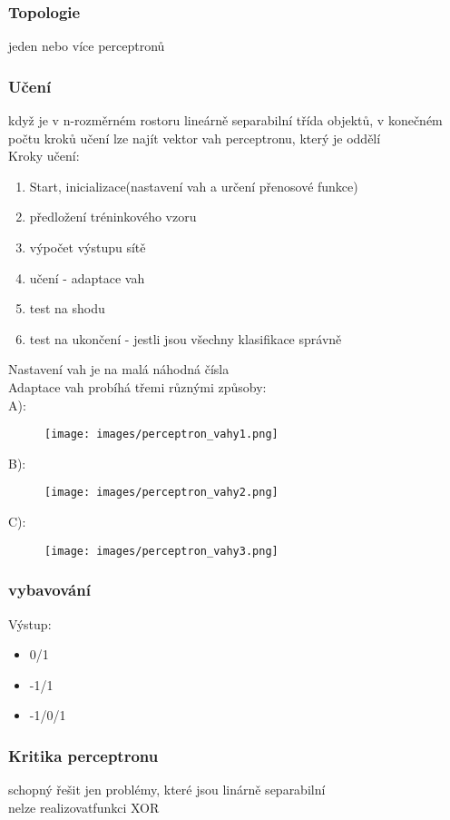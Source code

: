 \subsubsection{Topologie}
jeden nebo více perceptronů
\subsubsection{Učení}
když je v n-rozměrném rostoru lineárně separabilní třída objektů, v konečném počtu kroků učení lze najít vektor vah perceptronu, který je oddělí\\
Kroky učení:
\begin{enumerate}
    \item Start, inicializace(nastavení vah a určení přenosové funkce)
    \item předložení tréninkového vzoru
    \item výpočet výstupu sítě
    \item učení - adaptace vah
    \item test na shodu
    \item test na ukončení - jestli jsou všechny klasifikace správně
\end{enumerate}
Nastavení vah je na malá náhodná čísla\\
Adaptace vah probíhá třemi různými způsoby:\\
A):
\begin{figure}[H]
    \texttt{[image: images/perceptron\_vahy1.png]}
\end{figure}
B):
\begin{figure}[H]
    \texttt{[image: images/perceptron\_vahy2.png]}
\end{figure}
C):
\begin{figure}[H]
    \texttt{[image: images/perceptron\_vahy3.png]}
\end{figure}

\subsubsection{vybavování}
Výstup:
\begin{itemize}
    \item 0/1
    \item -1/1
    \item -1/0/1
\end{itemize}
\subsubsection*{Kritika perceptronu}
schopný řešit jen problémy, které jsou linárně separabilní\\
nelze realizovatfunkci XOR


